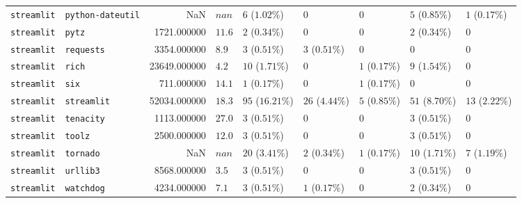 \begin{table}
\begin{tabular}{llrllllll}
\texttt{streamlit} & \texttt{python-dateutil} & NaN & $nan$ & $6$ ($1.02\%$) & $0$ & $0$ & $5$ ($0.85\%$) & $1$ ($0.17\%$) \\
\texttt{streamlit} & \texttt{pytz} & 1721.000000 & $11.6$ & $2$ ($0.34\%$) & $0$ & $0$ & $2$ ($0.34\%$) & $0$ \\
\texttt{streamlit} & \texttt{requests} & 3354.000000 & $8.9$ & $3$ ($0.51\%$) & $3$ ($0.51\%$) & $0$ & $0$ & $0$ \\
\texttt{streamlit} & \texttt{rich} & 23649.000000 & $4.2$ & $10$ ($1.71\%$) & $0$ & $1$ ($0.17\%$) & $9$ ($1.54\%$) & $0$ \\
\texttt{streamlit} & \texttt{six} & 711.000000 & $14.1$ & $1$ ($0.17\%$) & $0$ & $1$ ($0.17\%$) & $0$ & $0$ \\
\texttt{streamlit} & \texttt{streamlit} & 52034.000000 & $18.3$ & $95$ ($16.21\%$) & $26$ ($4.44\%$) & $5$ ($0.85\%$) & $51$ ($8.70\%$) & $13$ ($2.22\%$) \\
\texttt{streamlit} & \texttt{tenacity} & 1113.000000 & $27.0$ & $3$ ($0.51\%$) & $0$ & $0$ & $3$ ($0.51\%$) & $0$ \\
\texttt{streamlit} & \texttt{toolz} & 2500.000000 & $12.0$ & $3$ ($0.51\%$) & $0$ & $0$ & $3$ ($0.51\%$) & $0$ \\
\texttt{streamlit} & \texttt{tornado} & NaN & $nan$ & $20$ ($3.41\%$) & $2$ ($0.34\%$) & $1$ ($0.17\%$) & $10$ ($1.71\%$) & $7$ ($1.19\%$) \\
\texttt{streamlit} & \texttt{urllib3} & 8568.000000 & $3.5$ & $3$ ($0.51\%$) & $0$ & $0$ & $3$ ($0.51\%$) & $0$ \\
\texttt{streamlit} & \texttt{watchdog} & 4234.000000 & $7.1$ & $3$ ($0.51\%$) & $1$ ($0.17\%$) & $0$ & $2$ ($0.34\%$) & $0$ \\
\bottomrule
\end{tabular}
\end{table}
